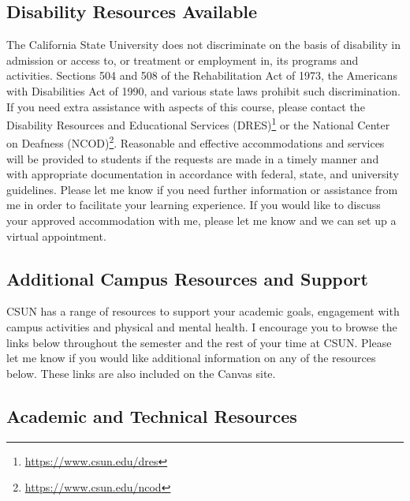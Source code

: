 \documentclass[
  letterpaper,
  DIV=11,
  numbers=noendperiod]{scrartcl}
\DeclareRobustCommand{\href}[2]{#2\footnote{\url{#1}}}
\begin{document}
\hypertarget{disability-resources-available}{%
\subsection{\texorpdfstring{\textbf{Disability Resources
Available}}{Disability Resources Available}}\label{disability-resources-available}}

The California State University does not discriminate on the basis of
disability in admission or access to, or treatment or employment in, its
programs and activities. Sections 504 and 508 of the Rehabilitation Act
of 1973, the Americans with Disabilities Act of 1990, and various state
laws prohibit such discrimination. If you need extra assistance with
aspects of this course, please contact the
\href{https://www.csun.edu/dres}{Disability Resources and Educational
Services (DRES)} or the \href{https://www.csun.edu/ncod}{National Center
on Deafness (NCOD)}. Reasonable and effective accommodations and
services will be provided to students if the requests are made in a
timely manner and with appropriate documentation in accordance with
federal, state, and university guidelines. Please let me know if you
need further information or assistance from me in order to facilitate
your learning experience. If you would like to discuss your approved
accommodation with me, please let me know and we can set up a virtual
appointment.~

\hypertarget{additional-campus-resources-and-support}{%
\subsection{\texorpdfstring{\textbf{Additional Campus Resources and
Support}}{Additional Campus Resources and Support}}\label{additional-campus-resources-and-support}}

CSUN has a range of resources to support your academic goals, engagement
with campus activities and physical and mental health. I encourage you
to browse the links below throughout the semester and the rest of your
time at CSUN. Please let me know if you would like additional
information on any of the resources below. These links are also included
on the Canvas site.

\hypertarget{academic-and-technical-resources}{%
\subsection{Academic and Technical
Resources}\label{academic-and-technical-resources}}
\end{document}
